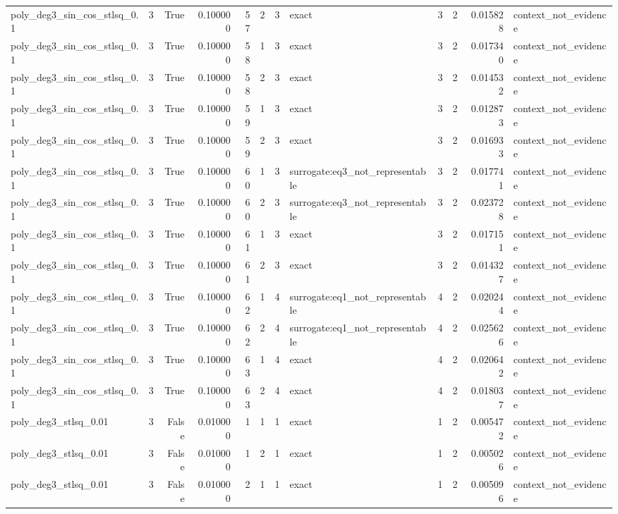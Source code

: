 \begin{tabular}{lrrrrrrlrrrl}
poly\_deg3\_sin\_cos\_stlsq\_0.1 & 3 & True & 0.100000 & 57 & 2 & 3 & exact & 3 & 2 & 0.015828 & context\_not\_evidence \\
poly\_deg3\_sin\_cos\_stlsq\_0.1 & 3 & True & 0.100000 & 58 & 1 & 3 & exact & 3 & 2 & 0.017340 & context\_not\_evidence \\
poly\_deg3\_sin\_cos\_stlsq\_0.1 & 3 & True & 0.100000 & 58 & 2 & 3 & exact & 3 & 2 & 0.014532 & context\_not\_evidence \\
poly\_deg3\_sin\_cos\_stlsq\_0.1 & 3 & True & 0.100000 & 59 & 1 & 3 & exact & 3 & 2 & 0.012873 & context\_not\_evidence \\
poly\_deg3\_sin\_cos\_stlsq\_0.1 & 3 & True & 0.100000 & 59 & 2 & 3 & exact & 3 & 2 & 0.016933 & context\_not\_evidence \\
poly\_deg3\_sin\_cos\_stlsq\_0.1 & 3 & True & 0.100000 & 60 & 1 & 3 & surrogate:eq3\_not\_representable & 3 & 2 & 0.017741 & context\_not\_evidence \\
poly\_deg3\_sin\_cos\_stlsq\_0.1 & 3 & True & 0.100000 & 60 & 2 & 3 & surrogate:eq3\_not\_representable & 3 & 2 & 0.023728 & context\_not\_evidence \\
poly\_deg3\_sin\_cos\_stlsq\_0.1 & 3 & True & 0.100000 & 61 & 1 & 3 & exact & 3 & 2 & 0.017151 & context\_not\_evidence \\
poly\_deg3\_sin\_cos\_stlsq\_0.1 & 3 & True & 0.100000 & 61 & 2 & 3 & exact & 3 & 2 & 0.014327 & context\_not\_evidence \\
poly\_deg3\_sin\_cos\_stlsq\_0.1 & 3 & True & 0.100000 & 62 & 1 & 4 & surrogate:eq1\_not\_representable & 4 & 2 & 0.020244 & context\_not\_evidence \\
poly\_deg3\_sin\_cos\_stlsq\_0.1 & 3 & True & 0.100000 & 62 & 2 & 4 & surrogate:eq1\_not\_representable & 4 & 2 & 0.025626 & context\_not\_evidence \\
poly\_deg3\_sin\_cos\_stlsq\_0.1 & 3 & True & 0.100000 & 63 & 1 & 4 & exact & 4 & 2 & 0.020642 & context\_not\_evidence \\
poly\_deg3\_sin\_cos\_stlsq\_0.1 & 3 & True & 0.100000 & 63 & 2 & 4 & exact & 4 & 2 & 0.018037 & context\_not\_evidence \\
poly\_deg3\_stlsq\_0.01 & 3 & False & 0.010000 & 1 & 1 & 1 & exact & 1 & 2 & 0.005472 & context\_not\_evidence \\
poly\_deg3\_stlsq\_0.01 & 3 & False & 0.010000 & 1 & 2 & 1 & exact & 1 & 2 & 0.005026 & context\_not\_evidence \\
poly\_deg3\_stlsq\_0.01 & 3 & False & 0.010000 & 2 & 1 & 1 & exact & 1 & 2 & 0.005096 & context\_not\_evidence \\

\end{tabular}
